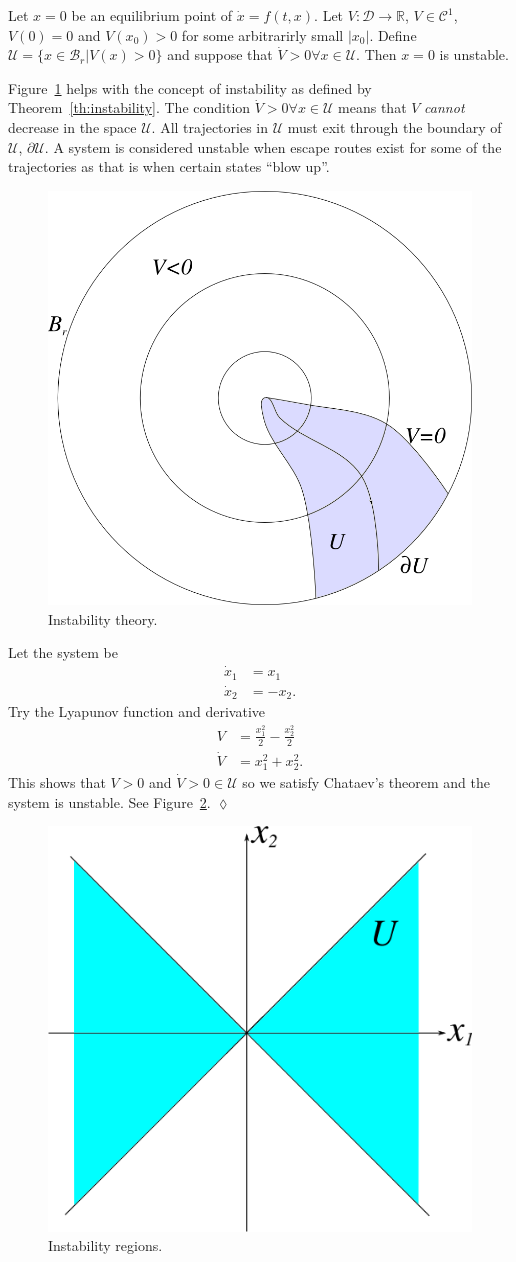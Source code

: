 \begin{theorem}
\label{th:instability}
Let $x=0$ be an equilibrium point of $\dot{x}=f(t,x)$.
Let $V:\mathcal{D}\to\mathbb{R}$, $V\in\mathcal{C}^1$, $V(0)=0$ and $V(x_0)>0$ for some arbitrarirly small $|x_0|$.
Define $\mathcal{U}=\{x\in \mathcal{B}_r | V(x)>0\}$ and suppose that $\dot{V}>0 \forall x\in\mathcal{U}$.
Then $x=0$ is unstable.
\end{theorem}

Figure~\ref{fig:10theoremBall} helps with the concept of instability as defined by Theorem~\ref{th:instability}.
The condition $\dot{V}>0\forall x\in\mathcal{U}$ means that $V$ \textit{cannot} decrease in the space $\mathcal{U}$.
All trajectories in $\mathcal{U}$ must exit through the boundary of $\mathcal{U}$, $\partial\mathcal{U}$.
A system is considered unstable when escape routes exist for some of the trajectories as that is when certain states ``blow up''.

\begin{figure}[ht!]
\centering
\includegraphics[width=.4\textwidth]{images/10theoremBall}
\caption{Instability theory.}
\label{fig:10theoremBall}
\end{figure}

\begin{example}
Let the system be
\begin{align*}
\dot{x}_1 &= x_1 \\
\dot{x}_2 &= -x_2.
\end{align*}
Try the Lyapunov function and derivative
\begin{align*}
V &= \frac{x_1^2}{2} - \frac{x_2^2}{2} \\
\dot{V} &= x_1^2 + x_2^2.
\end{align*}
This shows that $V>0$ and $\dot{V}>0\in\mathcal{U}$ so we satisfy Chataev's theorem and the system is unstable.
See Figure~\ref{fig:10unstableV}.
$\lozenge$
\end{example}

\begin{figure}[ht!]
\centering
\includegraphics[width=.4\textwidth]{images/10unstableV}
\caption{Instability regions.}
\label{fig:10unstableV}
\end{figure}

